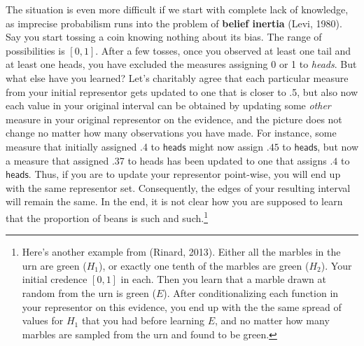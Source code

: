 \documentclass[
  10pt,
  dvipsnames,enabledeprecatedfontcommands]{scrartcl}
\newcommand{\s}[1]{\mbox{$\mathsf{#1}$}}
\begin{document}
The situation is even more difficult if we start with complete lack of
knowledge, as imprecise probabilism runs into the problem of
\textbf{belief inertia} (Levi, 1980). Say you start tossing a coin
knowing nothing about its bias. The range of possibilities is \([0,1]\).
After a few tosses, once you observed at least one tail and at least one
heads, you have excluded the measures assigning 0 or 1 to \emph{heads}.
But what else have you learned? Let's charitably agree that each
particular measure from your initial representor gets updated to one
that is closer to .5, but also now each value in your original interval
can be obtained by updating some \emph{other} measure in your original
representor on the evidence, and the picture does not change no matter
how many observations you have made. For instance, some measure that
initially assigned .4 to \s{heads} might now assign \s{.45} to
\s{heads}, but now a measure that assigned .37 to heads has been updated
to one that assigns \(.4\) to \s{heads}. Thus, if you are to update your
representor point-wise, you will end up with the same representor set.
Consequently, the edges of your resulting interval will remain the same.
In the end, it is not clear how you are supposed to learn that the
proportion of beans is such and such.\footnote{ Here's another example
  from (Rinard, 2013). Either all the marbles in the urn are green
  (\(H_1\)), or exactly one tenth of the marbles are green (\(H_2\)).
  Your initial credence \([0,1]\) in each. Then you learn that a marble
  drawn at random from the urn is green (\(E\)). After conditionalizing
  each function in your representor on this evidence, you end up with
  the the same spread of values for \(H_1\) that you had before learning
  \(E\), and no matter how many marbles are sampled from the urn and
  found to be green.}
\end{document}
